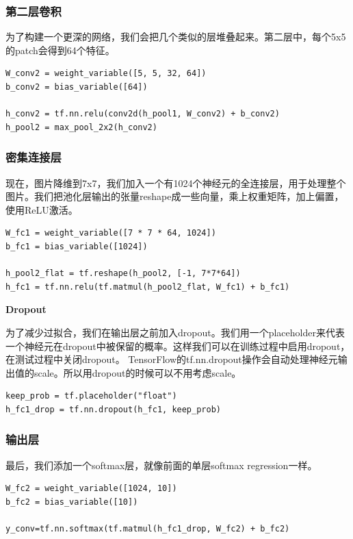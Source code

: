 \documentclass[a4paper,11pt,twoside]{ctexbook}
\begin{document}
\subsubsection{第二层卷积}

为了构建一个更深的网络，我们会把几个类似的层堆叠起来。第二层中，每个5x5的patch会得到64个特征。

\begin{lstlisting}
W_conv2 = weight_variable([5, 5, 32, 64])
b_conv2 = bias_variable([64])

h_conv2 = tf.nn.relu(conv2d(h_pool1, W_conv2) + b_conv2)
h_pool2 = max_pool_2x2(h_conv2)
\end{lstlisting}

\subsubsection{密集连接层}

现在，图片降维到7x7，我们加入一个有1024个神经元的全连接层，用于处理整个图片。我们把池化层输出的张量reshape成一些向量，乘上权重矩阵，加上偏置，使用ReLU激活。

\begin{lstlisting}
W_fc1 = weight_variable([7 * 7 * 64, 1024])
b_fc1 = bias_variable([1024])

h_pool2_flat = tf.reshape(h_pool2, [-1, 7*7*64])
h_fc1 = tf.nn.relu(tf.matmul(h_pool2_flat, W_fc1) + b_fc1)
\end{lstlisting}

\textbf{Dropout}

为了减少过拟合，我们在输出层之前加入dropout。我们用一个placeholder来代表一个神经元在dropout中被保留的概率。这样我们可以在训练过程中启用dropout，在测试过程中关闭dropout。 TensorFlow的tf.nn.dropout操作会自动处理神经元输出值的scale。所以用dropout的时候可以不用考虑scale。

\begin{lstlisting}
keep_prob = tf.placeholder("float")
h_fc1_drop = tf.nn.dropout(h_fc1, keep_prob)
\end{lstlisting}

\subsubsection{输出层}

最后，我们添加一个softmax层，就像前面的单层softmax regression一样。

\begin{lstlisting}
W_fc2 = weight_variable([1024, 10])
b_fc2 = bias_variable([10])

y_conv=tf.nn.softmax(tf.matmul(h_fc1_drop, W_fc2) + b_fc2)
\end{lstlisting}
\end{document}
